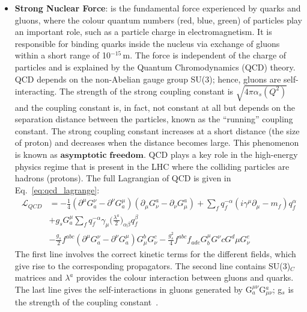 \begin{itemize}
\item{\textbf{Strong Nuclear Force}}: is the fundamental force experienced by quarks and gluons, where the colour quantum numbers (red, blue, green) of particles play an important role, such as a particle charge in electromagnetism. It is responsible for binding quarks inside the nucleus via exchange of gluons within a short range of 10$^{-15}$\,m. The force is independent of the charge of particles and is explained by the Quantum Chromodynamics (QCD) theory. QCD depends on the non-Abelian gauge group SU(3); hence, gluons are self-interacting. The strength of the strong coupling constant is $\sqrt{4\pi\alpha_{s}(Q^{2})} $ and the coupling constant is, in fact, not constant at all but depends on the separation distance between the particles, known as the ``running'' coupling constant. The strong coupling constant increases at a short distance (the size of proton) and decreases when the distance becomes large. This phenomenon is known as $\textbf{asymptotic freedom}$. QCD plays a key role in the high-energy physics regime that is present in the LHC where the colliding particles are hadrons (protons). The full Lagrangian of QCD is given in Eq.~\ref{eq:qcd_lagrange}:
\begin{equation}
\begin{split}
\mathcal{L}_{QCD} & = -\frac{1}{4}(\partial^{\mu}G^{\nu}_{a} - \partial^{\nu}G^{\mu}_{a})(\partial_{\mu}G_{\nu}^{a} - \partial_{\nu}G_{\mu}^{a}) + \sum\limits_{f}q^{-\alpha}_{f}(i\gamma^{\mu}\partial_{\mu} - m_{f})q^{\alpha}_{f} \\
& + g_{s}G^{\mu}_{a} \sum\limits_{f} q^{-\alpha}_{f}\gamma_{\mu}\bigg(\frac{\lambda^{a}}{2}\bigg)_{\alpha\beta}q^{\beta}_{f}\\
& - \frac{g_{s}}{2}f^{abc}(\partial^{\mu}G^{\nu}_{a} - \partial^{\nu}G^{\mu}_{a})G_{\mu}^{b}G_{\nu}^{c} - \frac{g_{s}^{2}}{4}f^{abc}f_{ade}G^{\mu}_{b}G^{\nu}{c}G^{d}{\mu}G^{e}_{\nu}
\end{split}\label{eq:qcd_lagrange} 
\end{equation}    
The first line involves the correct kinetic terms for the different fields, which give rise to the corresponding propagators. The second line contains SU(3)$_{C}$ matrices and $\lambda^{a}$ provides the colour interaction between gluons and quarks. The last line gives the self-interactions in gluons generated by G$^{\mu\nu}_{a}$G$_{\mu\nu}^{a}$; g$_{s}$ is the strength of the coupling constant~\cite{strong_force}. 


\end{itemize}
